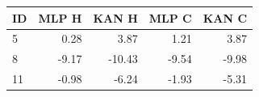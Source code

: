 \begin{center}
\small
\setlength{\tabcolsep}{4pt}
\begin{tabular}{@{}lrrrr@{}}
\toprule
ID & MLP H & KAN H & MLP C & KAN C\\
\midrule
5 & 0.28 & 3.87 & 1.21 & 3.87\\
8 & -9.17 & -10.43 & -9.54 & -9.98\\
11 & -0.98 & -6.24 & -1.93 & -5.31\\
\bottomrule
\end{tabular}
\end{center}
